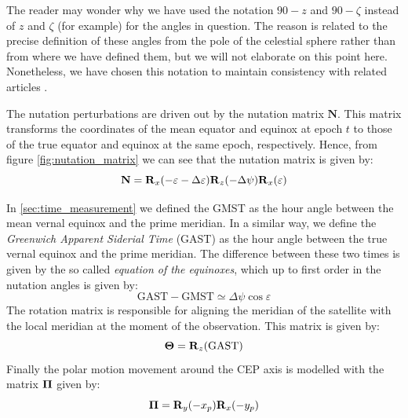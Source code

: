 \documentclass[../main.tex]{subfiles}
\begin{document}
The reader may wonder why we have used the notation $90-z$ and $90-\zeta$ instead of $z$ and $\zeta$ (for example) for the angles in question. The reason is related to the precise definition of these angles from the pole of the celestial sphere rather than from where we have defined them, but we will not elaborate on this point here. Nonetheless, we have chosen this notation to maintain consistency with related articles \cite{lieske}.

The nutation perturbations are driven out by the nutation matrix $\mathbf{N}$. This matrix transforms the coordinates of the mean equator and equinox at epoch $t$ to those of the true equator and equinox at the same epoch, respectively. Hence, from figure \cref{fig:nutation_matrix} we can see that the nutation matrix is given by:
\begin{equation}
  \mathbf{N}=\boldsymbol{\mathrm{R}}_x(-\varepsilon-\Delta \varepsilon)\boldsymbol{\mathrm{R}}_z(-\Delta \psi)\boldsymbol{\mathrm{R}}_x(\varepsilon)
\end{equation}

In \cref{sec:time_measurement} we defined the GMST as the hour angle between the mean vernal equinox and the prime meridian. In a similar way, we define the \emph{Greenwich Apparent Siderial Time} (GAST) as the hour angle between the true vernal equinox and the prime meridian. The difference between these two times is given by the so called \emph{equation of the equinoxes}, which up to first order in the nutation angles is given by:
\begin{equation}
  \text{GAST}- \text{GMST}\simeq\Delta \psi\cos\varepsilon
\end{equation}
The rotation matrix is responsible for aligning the meridian of the satellite with the local meridian at the moment of the observation. This matrix is given by:
\begin{equation}
  \boldsymbol{\mathrm{\Theta}}=\boldsymbol{\mathrm{R}}_z(\text{GAST})
\end{equation}
Finally the polar motion movement around the CEP axis is modelled with the matrix $\boldsymbol{\mathrm{\Pi}}$ given by:
\begin{equation}
  \boldsymbol{\mathrm{\Pi}}=\boldsymbol{\mathrm{R}}_y(- x_p)\boldsymbol{\mathrm{R}}_x(- y_p)
\end{equation}
\end{document}
